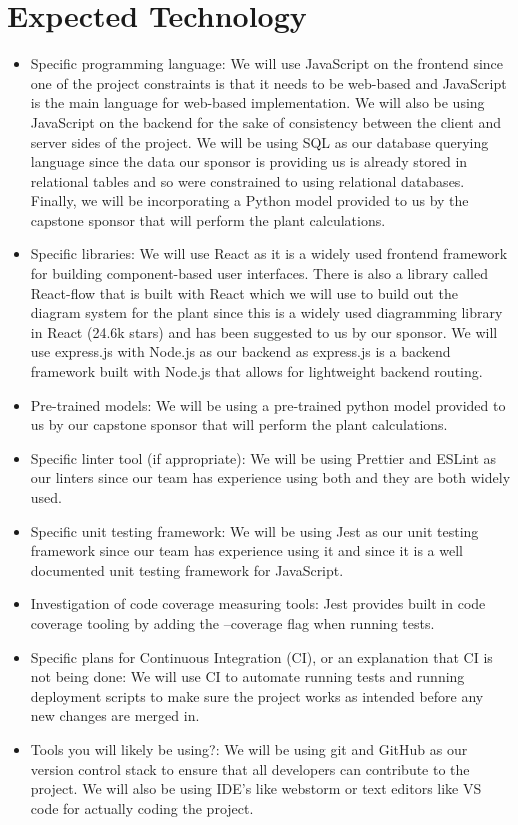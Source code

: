 \documentclass{article}
\begin{document}
\section{Expected Technology}

\begin{itemize}
\item Specific programming language:
We will use JavaScript on the frontend since one of the project constraints is that it needs to be web-based and JavaScript is the main language for web-based implementation. We will also be using JavaScript on the backend for the sake of consistency between the client and server sides of the project. We will be using SQL as our database querying language since the data our sponsor is providing us is already stored in relational tables and so were constrained to using relational databases. Finally, we will be incorporating a Python model provided to us by the capstone sponsor that will perform the plant calculations. 
\item Specific libraries:
We will use React as it is a widely used frontend framework for building component-based user interfaces. There is also a library called React-flow that is built with React which we will use to build out the diagram system for the plant since this is a widely used diagramming library in React (24.6k stars) and has been suggested to us by our sponsor. We will use express.js with Node.js as our backend as express.js is a backend framework built with Node.js that allows for lightweight backend routing. 
\item Pre-trained models:
We will be using a pre-trained python model provided to us by our capstone sponsor that will perform the plant calculations. 
\item Specific linter tool (if appropriate):
We will be using Prettier and ESLint as our linters since our team has experience using both and they are both widely used. 
\item Specific unit testing framework:
We will be using Jest as our unit testing framework since our team has experience using it and since it is a well documented unit testing framework for JavaScript. 
\item Investigation of code coverage measuring tools:
Jest provides built in code coverage tooling by adding the --coverage flag when running tests. 
\item Specific plans for Continuous Integration (CI), or an explanation that CI is not being done:
We will use CI to automate running tests and running deployment scripts to make sure the project works as intended before any new changes are merged in. 
\item Tools you will likely be using?:
We will be using git and GitHub as our version control stack to ensure that all developers can contribute to the project. We will also be using IDE's like webstorm or text editors like VS code for actually coding the project. 
\end{itemize}
\end{document}
